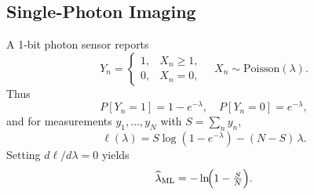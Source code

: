 \subsection{Single-Photon Imaging}

A 1-bit photon sensor reports
\begin{equation}
    Y_n = \begin{cases}
        1, & X_n\ge1, \\
        0, & X_n=0,
    \end{cases}
    \quad
    X_n\sim\mathrm{Poisson}(\lambda).
\end{equation}
Thus
\begin{equation}
    P[Y_n=1]=1-e^{-\lambda},\quad P[Y_n=0]=e^{-\lambda},
\end{equation}
and for measurements $y_1,\dots,y_N$ with $S=\sum_n y_n$,
\begin{equation}
    \ell(\lambda)
    = S\log(1-e^{-\lambda}) - (N-S)\,\lambda.
\end{equation}
Setting $d\ell/d\lambda=0$ yields
\begin{equation}
    \widehat\lambda_{\rm ML}
    = -\ln\!\Bigl(1 - \tfrac{S}{N}\Bigr).
\end{equation}
